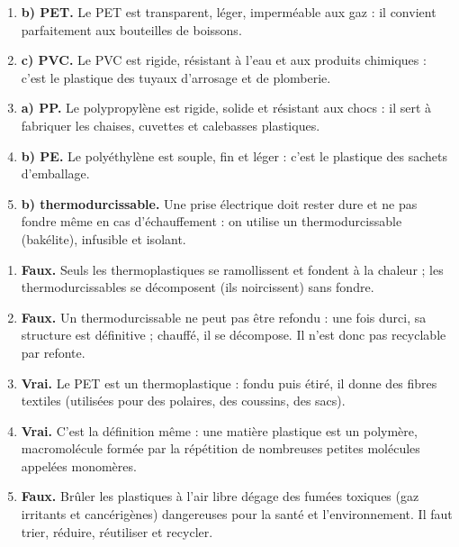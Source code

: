 \documentclass[11pt]{article}
\begin{document}
\begin{corrige}
\begin{enumerate}
\item \textbf{b) PET.} Le PET est transparent, léger, imperméable aux gaz : il convient parfaitement aux bouteilles de boissons.
\item \textbf{c) PVC.} Le PVC est rigide, résistant à l'eau et aux produits chimiques : c'est le plastique des tuyaux d'arrosage et de plomberie.
\item \textbf{a) PP.} Le polypropylène est rigide, solide et résistant aux chocs : il sert à fabriquer les chaises, cuvettes et calebasses plastiques.
\item \textbf{b) PE.} Le polyéthylène est souple, fin et léger : c'est le plastique des sachets d'emballage.
\item \textbf{b) thermodurcissable.} Une prise électrique doit rester dure et ne pas fondre même en cas d'échauffement : on utilise un thermodurcissable (bakélite), infusible et isolant.
\end{enumerate}
\end{corrige}

\begin{corrige}
\begin{enumerate}
\item \textbf{Faux.} Seuls les thermoplastiques se ramollissent et fondent à la chaleur ; les thermodurcissables se décomposent (ils noircissent) sans fondre.
\item \textbf{Faux.} Un thermodurcissable ne peut pas être refondu : une fois durci, sa structure est définitive ; chauffé, il se décompose. Il n'est donc pas recyclable par refonte.
\item \textbf{Vrai.} Le PET est un thermoplastique : fondu puis étiré, il donne des fibres textiles (utilisées pour des polaires, des coussins, des sacs).
\item \textbf{Vrai.} C'est la définition même : une matière plastique est un polymère, macromolécule formée par la répétition de nombreuses petites molécules appelées monomères.
\item \textbf{Faux.} Brûler les plastiques à l'air libre dégage des fumées toxiques (gaz irritants et cancérigènes) dangereuses pour la santé et l'environnement. Il faut trier, réduire, réutiliser et recycler.
\end{enumerate}
\end{corrige}
\end{document}
